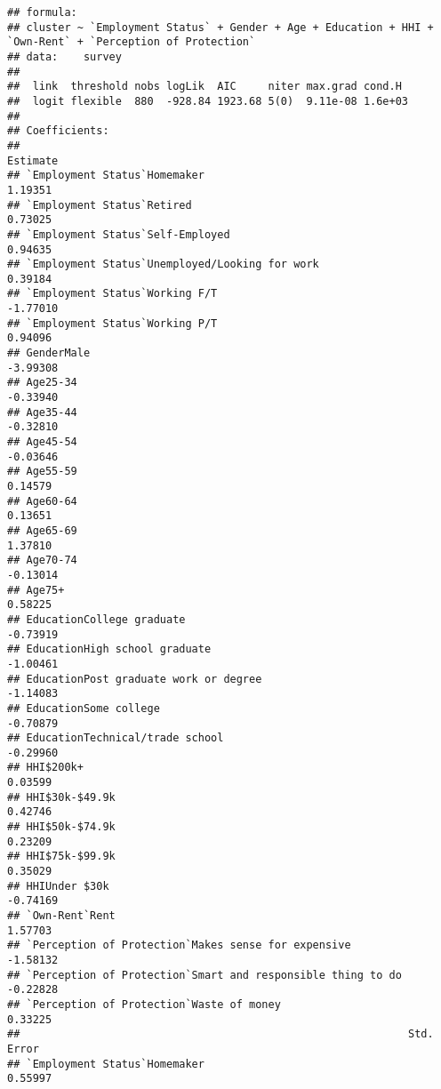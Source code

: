 \documentclass[]{article}
\begin{document}
\begin{verbatim}
## formula: 
## cluster ~ `Employment Status` + Gender + Age + Education + HHI + `Own-Rent` + `Perception of Protection`
## data:    survey
## 
##  link  threshold nobs logLik  AIC     niter max.grad cond.H 
##  logit flexible  880  -928.84 1923.68 5(0)  9.11e-08 1.6e+03
## 
## Coefficients:
##                                                             Estimate
## `Employment Status`Homemaker                                 1.19351
## `Employment Status`Retired                                   0.73025
## `Employment Status`Self-Employed                             0.94635
## `Employment Status`Unemployed/Looking for work               0.39184
## `Employment Status`Working F/T                              -1.77010
## `Employment Status`Working P/T                               0.94096
## GenderMale                                                  -3.99308
## Age25-34                                                    -0.33940
## Age35-44                                                    -0.32810
## Age45-54                                                    -0.03646
## Age55-59                                                     0.14579
## Age60-64                                                     0.13651
## Age65-69                                                     1.37810
## Age70-74                                                    -0.13014
## Age75+                                                       0.58225
## EducationCollege graduate                                   -0.73919
## EducationHigh school graduate                               -1.00461
## EducationPost graduate work or degree                       -1.14083
## EducationSome college                                       -0.70879
## EducationTechnical/trade school                             -0.29960
## HHI$200k+                                                    0.03599
## HHI$30k-$49.9k                                               0.42746
## HHI$50k-$74.9k                                               0.23209
## HHI$75k-$99.9k                                               0.35029
## HHIUnder $30k                                               -0.74169
## `Own-Rent`Rent                                               1.57703
## `Perception of Protection`Makes sense for expensive         -1.58132
## `Perception of Protection`Smart and responsible thing to do -0.22828
## `Perception of Protection`Waste of money                     0.33225
##                                                             Std. Error
## `Employment Status`Homemaker                                   0.55997

\end{verbatim}
\end{document}
